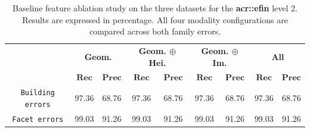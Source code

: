 \begin{table}[htbp]
\begin{tabular}{|c | c c | c c | c c | c c |}
                & \multicolumn{2}{c|}{\textbf{Geom.}} & \multicolumn{2}{c|}{\textbf{Geom. \(\oplus\) Hei.}} & \multicolumn{2}{c|}{\textbf{Geom. \(\oplus\) Im.}} & \multicolumn{2}{x{1.8cm}|}{\textbf{All}}\\
                \cline{2-9}
                & \(\bm{Rec}\) & \(\bm{Prec}\) &  \(\bm{Rec}\) & \(\bm{Prec}\) &  \(\bm{Rec}\) & \(\bm{Prec}\) &  \(\bm{Rec}\) & \(\bm{Prec}\) \\
                \hline
                \texttt{Building errors} & 97.36 & 68.76 & 97.36 & 68.76 & 97.36 & 68.76 & 97.36 & 68.76 \\
                \hline
                \texttt{Facet errors} & 99.03 & 91.26 & 99.03 & 91.26 & 99.03 & 91.26 & 99.03 & 91.26 \\
                \hline
            \end{tabular}
            \caption[
                Baseline feature ablation study on the three datasets for the \textbf{\gls{acr::efin}} level 2.
            ]{
                \label{tab::ablation_f2}
                Baseline feature ablation study on the three datasets for the \textbf{\gls{acr::efin}} level 2.
                Results are expressed in percentage.
                All four modality configurations are compared across both family errors.
            }
        \end{table}
    
